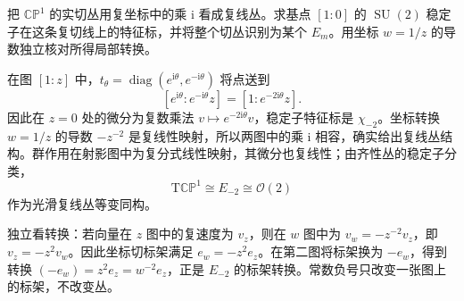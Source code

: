 \begin{exercise}\label{g1:ex:projective-tangent-weight}
	把 \(\mathbb{CP}^1\) 的实切丛用复坐标中的乘 \(\mathrm{i}\) 看成复线丛。求基点 \([1:0]\) 的 \(\operatorname{SU}(2)\) 稳定子在这条复切线上的特征标，并将整个切丛识别为某个 \(E_m\)。用坐标 \(w=1/z\) 的导数独立核对所得局部转换。
\end{exercise}
\begin{solution}
	在图 \([1:z]\) 中，\(t_\theta=\operatorname{diag}(e^{\mathrm{i}\theta},e^{-\mathrm{i}\theta})\) 将点送到
	\[
		[e^{\mathrm{i}\theta}:e^{-\mathrm{i}\theta}z]
		=[1:e^{-2\mathrm{i}\theta}z].
	\]
	因此在 \(z=0\) 处的微分为复数乘法 \(v\mapsto e^{-2\mathrm{i}\theta}v\)，稳定子特征标是 \(\chi_{-2}\)。坐标转换 \(w=1/z\) 的导数 \(-z^{-2}\) 是复线性映射，所以两图中的乘 \(\mathrm{i}\) 相容，确实给出复线丛结构。群作用在射影图中为复分式线性映射，其微分也复线性；由齐性丛的稳定子分类，
	\[
		\mathrm{T}\mathbb{CP}^1\cong E_{-2}\cong\mathcal O(2)
	\]
	作为光滑复线丛等变同构。

	独立看转换：若向量在 \(z\) 图中的复速度为 \(v_z\)，则在 \(w\) 图中为 \(v_w=-z^{-2}v_z\)，即 \(v_z=-z^2v_w\)。因此坐标切标架满足 \(e_w=-z^2e_z\)。在第二图将标架换为 \(-e_w\)，得到转换 \((-e_w)=z^2e_z=w^{-2}e_z\)，正是 \(E_{-2}\) 的标架转换。常数负号只改变一张图上的标架，不改变丛。
\end{solution}

